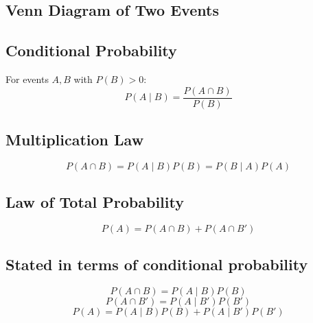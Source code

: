 \documentclass{article}
\begin{document}
\begin{multicols}{2}
\subsection*{Venn Diagram of Two Events}
\begin{center}
\end{center}

\subsection*{Conditional Probability}
For events \( A, B \) with \( P(B) > 0 \):
\[
P(A \mid B) = \frac{P(A \cap B)}{P(B)}
\]

\subsection*{Multiplication Law}
\[
P(A \cap B) = P(A \mid B)P(B) = P(B \mid A)P(A)
\]

\subsection*{Law of Total Probability}
\[
P(A) = P(A \cap B) + P(A \cap B')
\]

\subsection*{Stated in terms of conditional probability}
\[
P(A \cap B) = P(A \mid B)P(B)
\]
\[
P(A \cap B') = P(A \mid B')P(B')
\]
\[
P(A) = P(A \mid B)P(B) + P(A \mid B')P(B')
\]


\end{multicols}
\end{document}
